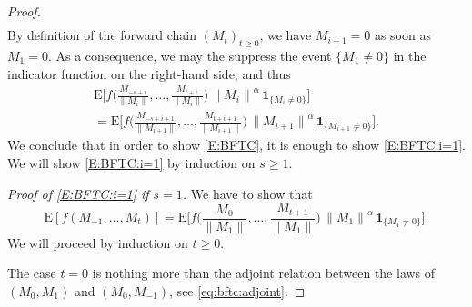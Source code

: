 \documentclass{aptpubarxiv}
\numberwithin{equation}{section}
\begin{document}
\begin{proof}
\begin{multline*}
\end{multline*}
By definition of the forward chain $(M_t)_{t \ge 0}$, we have $M_{i+1} = 0$ as soon as $M_1 = 0$. As a consequence, we may the suppress the event $\{ M_1 \ne 0 \}$ in the indicator function on the right-hand side, and thus
\begin{multline*}
  {\mathrm{E}} \biggl[ f \biggl( \frac{M_{-s+i}}{{\|{M_i}\|}}, \ldots, \frac{M_{t+i}}{{\|{M_i}\|}} \biggr) \, {\|{M_i}\|}^\alpha \, {\boldsymbol{1}}_{ \{ M_i \ne 0 \} } \biggr] \\
  = {\mathrm{E}} \biggl[ f \biggl( \frac{M_{-s+i+1}}{{\|{M_{i+1}}\|}}, \ldots, \frac{M_{t+i+1}}{{\|{M_{i+1}}\|}} \biggr) \, {\|{M_{i+1}}\|}^\alpha \, {\boldsymbol{1}}_{ \{ M_{i+1} \ne 0 \} } \biggr].
\end{multline*}
We conclude that in order to show \eqref{E:BFTC}, it is enough to show \eqref{E:BFTC:i=1}. We will show \eqref{E:BFTC:i=1} by induction on $s \ge 1$.

\emph{Proof of \eqref{E:BFTC:i=1} if $s = 1$.}
We have to show that
\begin{equation}
\label{E:BFTC:i=1,s=1}
  {\mathrm{E}} [ f ( M_{-1}, \ldots, M_t ) ] 
  = {\mathrm{E}} \biggl[ f \biggl( \frac{M_0}{{\|{M_1}\|}}, \ldots, \frac{M_{t+1}}{{\|{M_1}\|}} \biggr) \, {\|{M_1}\|}^\alpha \, {\boldsymbol{1}}_{ \{ M_1 \ne 0 \} } \biggr].
\end{equation}
We will proceed by induction on $t \ge 0$. 

The case $t = 0$ is nothing more than the adjoint relation between the laws of $(M_0, M_1)$ and $(M_0, M_{-1})$, see \eqref{eq:bftc:adjoint}. 


\end{proof}
\end{document}
